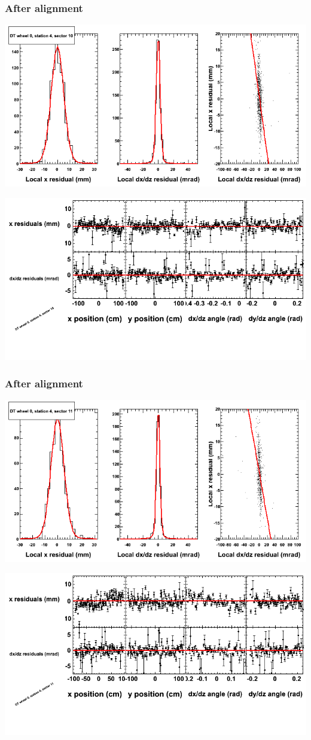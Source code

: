 \documentclass[compress]{beamer}
\begin{document}
\begin{frame}
\frametitle{After alignment}
\includegraphics[width=0.7\linewidth]{NOV4_fitfunctions/MBwhCst4sec10_bellcurves.png}

\includegraphics[width=0.7\linewidth]{NOV4_fitfunctions/MBwhCst4sec10_polynomials.png}
\end{frame}

\begin{frame}
\frametitle{After alignment}
\includegraphics[width=0.7\linewidth]{NOV4_fitfunctions/MBwhCst4sec11_bellcurves.png}

\includegraphics[width=0.7\linewidth]{NOV4_fitfunctions/MBwhCst4sec11_polynomials.png}
\end{frame}
\end{document}
